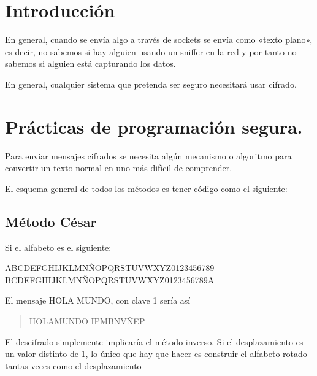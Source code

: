 \documentclass[letterpaper,10pt,spanish]{sphinxmanual}
\begin{document}
\section{Introducción}
\label{\detokenize{textos/tema5:introduccion}}
En general, cuando se envía algo a través de sockets se envía como «texto plano», es decir, no sabemos si hay alguien usando un sniffer en la red y por tanto no sabemos si alguien está capturando los datos.

En general, cualquier sistema que pretenda ser seguro necesitará usar cifrado.


\section{Prácticas de programación segura.}
\label{\detokenize{textos/tema5:practicas-de-programacion-segura}}
Para enviar mensajes cifrados se necesita algún mecanismo o algoritmo para convertir un texto normal en uno más difícil de comprender.

El esquema general de todos los métodos es tener código como el siguiente:

\begin{sphinxVerbatim}[commandchars=\\\{\}]
      

    
\end{sphinxVerbatim}


\subsection{Método César}
\label{\detokenize{textos/tema5:metodo-cesar}}
Si el alfabeto es el siguiente:

ABCDEFGHIJKLMNÑOPQRSTUVWXYZ0123456789\sphinxhyphen{}
BCDEFGHIJKLMNÑOPQRSTUVWXYZ0123456789\sphinxhyphen{}A

El mensaje HOLA MUNDO, con clave 1 sería así
\begin{quote}

HOLAMUNDO
IPMBNVÑEP
\end{quote}

El descifrado simplemente implicaría el método inverso. Si el desplazamiento es un valor distinto de 1, lo único que hay que hacer es construir el alfabeto rotado tantas veces como el desplazamiento
\end{document}
